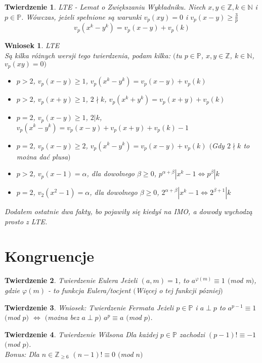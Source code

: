 \documentclass[10pt,a4paper]{article}
\theoremstyle{plain}
\newtheorem{thm}{Twierdzenie}[section]
\newtheorem*{cor}{Wniosek}
\theoremstyle{definition}
\theoremstyle{remark}
\newcommand{\N}{\mathbb{N}}
\newcommand{\Z}{\mathbb{Z}}
\newcommand{\p}{\mathbb{P}}
\begin{document}
	\begin{thm}{LTE - Lemat o Zwiększaniu Wykładniku.}
		Niech ${x,y \in \Z, k \in \N}$ i ${p \in \p}$. Wówczas, jeżeli spełnione są warunki ${v_p(xy)=0}$ i ${v_p(x-y) \geq \frac{3}{p}}$
		$${v_p(x^k-y^k)=v_p(x-y)+v_p(k)}$$
	\end{thm}
	\begin{cor}{LTE}
		\\
		Są kilka różnych wersji tego twierdzenia, podam kilka: $($tu $p \in \p$, $x,y \in \Z$, $k \in \N$, $v_p(xy)=0$$)$
		\begin{itemize}
			\item
			$p >2$, $v_p(x-y) \geq 1$, $v_p(x^k-y^k)=v_p(x-y)+v_p(k)$ 
			\item
			$p >2$, $v_p(x+y) \geq 1$, $2 \nmid k$, $v_p(x^k+y^k)=v_p(x+y)+v_p(k)$
			\item 
			$p =2$, $v_p(x-y) \geq 1$, $2 | k$, $v_p(x^k-y^k)=v_p(x-y)+v_p(x+y)+v_p(k)-1$
			\item 
			$p =2$, $v_p(x-y) \geq 2$, $v_p(x^k-y^k)=v_p(x-y)+v_p(k)$ $($Gdy $2 \nmid k$ to można dać plusa$)$
			\item 
			$p >2$, $v_p(x-1) = \alpha$, dla dowolnego $\beta \geq 0$, $p^{\alpha+\beta}|x^k-1 \Leftrightarrow p^\beta|k$
			\item 
			$p =2$, $v_2(x^2-1) = \alpha$, dla dowolnego $\beta \geq 0$, $2^{\alpha+\beta}|x^k-1 \Leftrightarrow 2^{\beta+1}|k$
		\end{itemize}
		Dodałem ostatnie dwa fakty, bo pojawiły się kiedyś na IMO, a dowody wychodzą prosto z LTE.
	\end{cor}
	\section{Kongruencje}
	\begin{thm}{Twierdzenie Eulera}
		Jeżeli ${(a,m)=1}$, to ${a^{\varphi(m)} \equiv 1}$ $($mod m$)$, gdzie $\varphi(m)$ - to funkcja Eulera/tocjent $($Więcej o tej funkcji pózniej$)$
	\end{thm}
	
	\begin{thm}{Wniosek: Twierdzenie Fermata}
		Jeżeli $p \in \p$ i $a \perp p$ to $a^{p-1} \equiv 1$ $($mod $p$$)$ $\Leftrightarrow$ $($można bez $a \perp p$$)$ $a^p \equiv a$ $($mod $p$$)$.
	\end{thm}
	\begin{thm}{Twierdzenie Wilsona}
		Dla każdej $p \in \p$ zachodzi $(p-1)! \equiv -1$ $($mod $p$$)$.
		\\ Bonus: Dla $n \in \Z_{\geq 6}$ $(n-1)! \equiv 0$ $($mod $n$$)$
	\end{thm}
	
\end{document}
